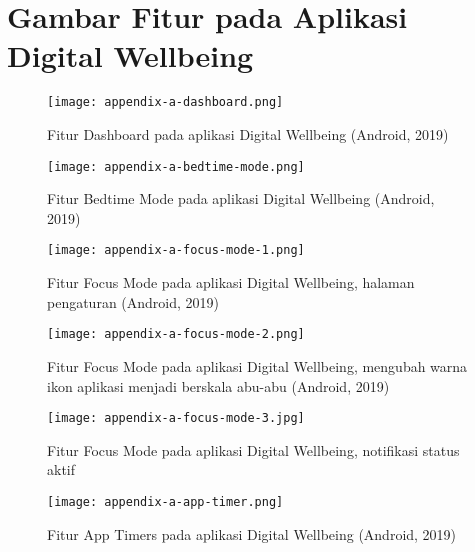 \chapter{Gambar Fitur pada Aplikasi Digital Wellbeing}
\label{chpt:gambar_dw}

\begin{figure}[h]
  \centering
  \texttt{[image: appendix-a-dashboard.png]}
  \caption{Fitur Dashboard pada aplikasi Digital Wellbeing (Android, 2019)}
\end{figure}

\begin{figure}[h]
  \centering
  \texttt{[image: appendix-a-bedtime-mode.png]}
  \caption{Fitur Bedtime Mode pada aplikasi Digital Wellbeing (Android, 2019)}
\end{figure}

\begin{figure}[h]
  \centering
  \texttt{[image: appendix-a-focus-mode-1.png]}
  \caption{Fitur Focus Mode pada aplikasi Digital Wellbeing, halaman pengaturan (Android, 2019)}
\end{figure}

\begin{figure}[h]
  \centering
  \texttt{[image: appendix-a-focus-mode-2.png]}
  \caption{Fitur Focus Mode pada aplikasi Digital Wellbeing, mengubah warna ikon aplikasi menjadi berskala abu-abu (Android, 2019)}
\end{figure}

\begin{figure}[h]
  \centering
  \texttt{[image: appendix-a-focus-mode-3.jpg]}
  \caption{Fitur Focus Mode pada aplikasi Digital Wellbeing, notifikasi status aktif}
\end{figure}

\begin{figure}[h]
  \centering
  \texttt{[image: appendix-a-app-timer.png]}
  \caption{Fitur App Timers pada aplikasi Digital Wellbeing (Android, 2019)}
\end{figure}

